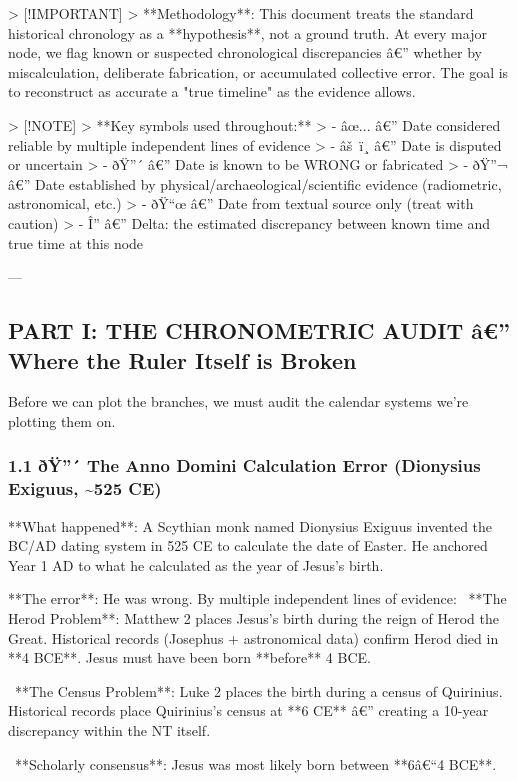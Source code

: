 \documentclass[aps,prd,11pt,onecolumn,superscriptaddress,nofootinbib,floatfix]{revtex4-2}
\begin{document}
> [!IMPORTANT]
> **Methodology**: This document treats the standard historical chronology as a **hypothesis**, not a ground truth. At every major node, we flag known or suspected chronological discrepancies â€'' whether by miscalculation, deliberate fabrication, or accumulated collective error. The goal is to reconstruct as accurate a "true timeline" as the evidence allows.


> [!NOTE]
> **Key symbols used throughout:**
> - âœ... â€'' Date considered reliable by multiple independent lines of evidence
> - âš ï¸ â€'' Date is disputed or uncertain
> - ðŸ''´ â€'' Date is known to be WRONG or fabricated
> - ðŸ''¬ â€'' Date established by physical/archaeological/scientific evidence (radiometric, astronomical, etc.)
> - ðŸ``œ â€'' Date from textual source only (treat with caution)
> - Î'' â€'' Delta: the estimated discrepancy between known time and true time at this node


---


\subsection{PART I: THE CHRONOMETRIC AUDIT â€'' Where the Ruler Itself is Broken}


Before we can plot the branches, we must audit the calendar systems we're plotting them on.


\subsubsection{1.1 ðŸ''´ The Anno Domini Calculation Error (Dionysius Exiguus, \textasciitilde{}525 CE)}


**What happened**: A Scythian monk named Dionysius Exiguus invented the BC/AD dating system in 525 CE to calculate the date of Easter. He anchored Year 1 AD to what he calculated as the year of Jesus's birth.


**The error**: He was wrong. By multiple independent lines of evidence:
\textbullet~**The Herod Problem**: Matthew 2 places Jesus's birth during the reign of Herod the Great. Historical records (Josephus + astronomical data) confirm Herod died in **4 BCE**. Jesus must have been born **before** 4 BCE.

\textbullet~**The Census Problem**: Luke 2 places the birth during a census of Quirinius. Historical records place Quirinius's census at **6 CE** â€'' creating a 10-year discrepancy within the NT itself.

\textbullet~**Scholarly consensus**: Jesus was most likely born between **6â€``4 BCE**.
\end{document}
